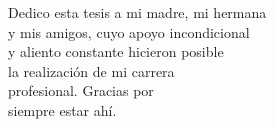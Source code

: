 \begin{dedication}

Dedico esta tesis a mi madre, mi hermana \\ 
y mis amigos, cuyo apoyo incondicional \\ 
y aliento constante hicieron posible \\
la realización de mi carrera \\
profesional. Gracias por \\
siempre estar ahí.

\end{dedication}